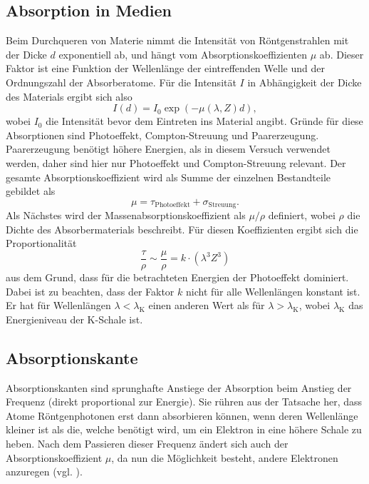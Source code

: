 \subsection{Absorption in Medien}
Beim Durchqueren von Materie nimmt die Intensität von Röntgenstrahlen mit der Dicke $d$ exponentiell ab, und hängt vom Absorptionskoeffizienten $\mu$ ab. Dieser Faktor ist eine Funktion der Wellenlänge der eintreffenden Welle und der Ordnungszahl der Absorberatome. Für die Intensität $I$ in Abhängigkeit der Dicke des Materials ergibt sich also
\begin{equation}\label{eqn:mu}
	I(d)=I_0\exp{(-\mu(\lambda, Z)d)},
\end{equation}
wobei $I_0$ die Intensität bevor dem Eintreten ins Material angibt. 
Gründe für diese Absorptionen sind Photoeffekt, Compton-Streuung und Paarerzeugung. Paarerzeugung benötigt höhere Energien, als in diesem Versuch verwendet werden, daher sind hier nur Photoeffekt und Compton-Streuung relevant. Der gesamte Absorptionskoeffizient wird als Summe der einzelnen Bestandteile gebildet als
\begin{equation}
	\mu=\tau_{\mathrm{Photoeffekt}}+\sigma_{\mathrm{Streuung}}.
\end{equation}
Als Nächstes wird der Massenabsorptionskoeffizient als $\mu/\rho$ definiert, wobei $\rho$ die Dichte des Absorbermaterials beschreibt. Für diesen Koeffizienten ergibt sich die Proportionalität
\begin{equation}\label{eqn:tau}
	\frac{\tau}{\rho}\sim \frac{\mu}{\rho}=k\cdot(\lambda^3Z^3)
\end{equation}
aus dem Grund, dass für die betrachteten Energien der Photoeffekt dominiert. Dabei ist zu beachten, dass der Faktor $k$ nicht für alle Wellenlängen konstant ist. Er hat für Wellenlängen $\lambda<\lambda_{\mathrm{K}}$ einen anderen Wert als für $\lambda>\lambda_{\mathrm{K}}$, wobei $\lambda_\mathrm{K}$ das Energieniveau der K-Schale ist.
\subsection{Absorptionskante}

Absorptionskanten sind sprunghafte Anstiege der Absorption beim Anstieg der Frequenz (direkt proportional zur Energie). Sie rühren aus der Tatsache her, dass Atome Röntgenphotonen erst dann absorbieren können, wenn deren Wellenlänge kleiner ist als die, welche benötigt wird, um ein Elektron in eine höhere Schale zu heben. Nach dem Passieren dieser Frequenz ändert sich auch der Absorptionskoeffizient $\mu$, da nun die Möglichkeit besteht, andere Elektronen anzuregen (vgl. \autocite{absorbtionskante}).

